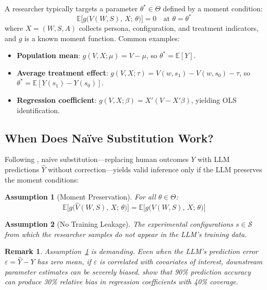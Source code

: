 \documentclass[12pt]{article}
\newtheorem{assumption}{Assumption}
\newtheorem{remark}{Remark}
\newcommand{\E}{\mathbb{E}}
\begin{document}
A researcher typically targets a parameter $\theta^* \in \Theta$ defined by a moment condition:
\begin{equation}
  \E\bigl[g\bigl(V(W, S),\, X;\, \theta\bigr)\bigr] = 0 \quad \text{at } \theta = \theta^*
\end{equation}
where $X = (W, S, A)$ collects persona, configuration, and treatment indicators, and $g$ is a known moment function. Common examples:
\begin{itemize}
  \item \textbf{Population mean}: $g(V, X; \mu) = V - \mu$, so $\theta^* = \E[Y]$.
  \item \textbf{Average treatment effect}: $g(V, X; \tau) = V(w, s_1) - V(w, s_0) - \tau$, so $\theta^* = \E[Y(s_1) - Y(s_0)]$.
  \item \textbf{Regression coefficient}: $g(V, X; \beta) = X'(V - X'\beta)$, yielding OLS identification.
\end{itemize}

\subsection{When Does Na\"ive Substitution Work?}

Following \citet{ludwig2025large}, na\"ive substitution---replacing human outcomes $Y$ with LLM predictions $\hat{Y}$ without correction---yields valid inference only if the LLM preserves the moment conditions:

\begin{assumption}[Moment Preservation]
\label{ass:moment}
For all $\theta \in \Theta$:
\begin{equation}
  \E\bigl[g\bigl(\hat{V}(W, S),\, X;\, \theta\bigr)\bigr] = \E\bigl[g\bigl(V(W, S),\, X;\, \theta\bigr)\bigr]
\end{equation}
\end{assumption}

\begin{assumption}[No Training Leakage]
\label{ass:leakage}
The experimental configurations $s \in \mathcal{S}$ from which the researcher samples do not appear in the LLM's training data.
\end{assumption}

\begin{remark}
Assumption~\ref{ass:moment} is demanding. Even when the LLM's prediction error $\varepsilon = \hat{Y} - Y$ has zero mean, if $\varepsilon$ is correlated with covariates of interest, downstream parameter estimates can be severely biased. \citet{egami2024using} show that 90\% prediction accuracy can produce 30\% relative bias in regression coefficients with 40\% coverage.
\end{remark}
\end{document}
